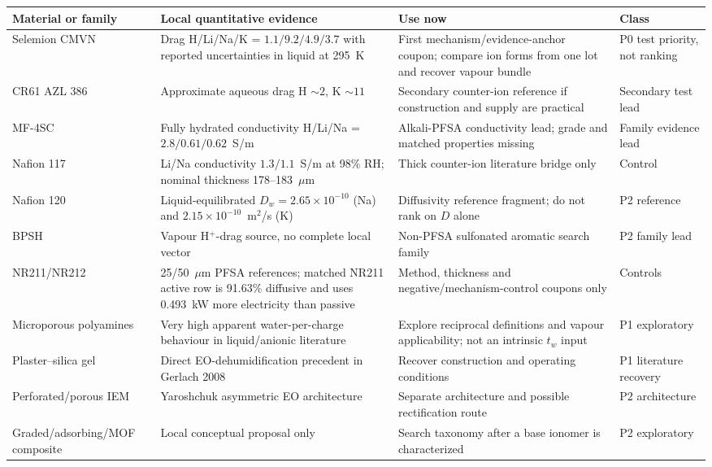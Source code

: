 \documentclass[10pt,a4paper]{article}
\begin{document}
\begin{center}\footnotesize
\begin{tabularx}{\textwidth}{@{}p{27mm}p{37mm}Y p{24mm}@{}}
\toprule
\textbf{Material or family} & \textbf{Local quantitative evidence} & \textbf{Use now} & \textbf{Class} \\
\midrule
Selemion CMVN & Drag H/Li/Na/K = $1.1/9.2/4.9/3.7$ with reported uncertainties in liquid at 295~K & First mechanism/evidence-anchor coupon; compare ion forms from one lot and recover vapour bundle & P0 test priority, not ranking \\
CR61 AZL 386 & Approximate aqueous drag H $\sim2$, K $\sim11$ & Secondary counter-ion reference if construction and supply are practical & Secondary test lead \\
MF-4SC & Fully hydrated conductivity H/Li/Na = $2.8/0.61/0.62$~S/m & Alkali-PFSA conductivity lead; grade and matched properties missing & Family evidence lead \\
Nafion 117 & Li/Na conductivity $1.3/1.1$~S/m at 98\% RH; nominal thickness 178--183~$\mu$m & Thick counter-ion literature bridge only & Control \\
Nafion 120 & Liquid-equilibrated $D_w=2.65\times10^{-10}$ (Na) and $2.15\times10^{-10}$~m$^2$/s (K) & Diffusivity reference fragment; do not rank on $D$ alone & P2 reference \\
BPSH & Vapour H$^+$-drag source, no complete local vector & Non-PFSA sulfonated aromatic search family & P2 family lead \\
NR211/NR212 & 25/50~$\mu$m PFSA references; matched NR211 active row is 91.63\% diffusive and uses 0.493~kW more electricity than passive & Method, thickness and negative/mechanism-control coupons only & Controls \\
Microporous polyamines & Very high apparent water-per-charge behaviour in liquid/anionic literature & Explore reciprocal definitions and vapour applicability; not an intrinsic $t_w$ input & P1 exploratory \\
Plaster--silica gel & Direct EO-dehumidification precedent in Gerlach 2008 & Recover construction and operating conditions & P1 literature recovery \\
Perforated/porous IEM & Yaroshchuk asymmetric EO architecture & Separate architecture and possible rectification route & P2 architecture \\
Graded/adsorbing/MOF composite & Local conceptual proposal only & Search taxonomy after a base ionomer is characterized & P2 exploratory \\
\bottomrule
\end{tabularx}
\end{center}
\end{document}
